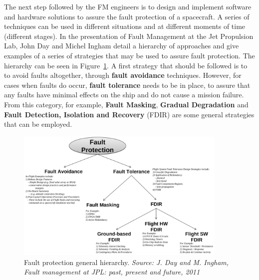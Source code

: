 The next step followed by the FM engineers is to design and implement software
and hardware solutions to assure the fault protection of a spacecraft. A series
of techniques can be used in different situations and at different moments of
time (different stages). In the presentation of Fault Management at the Jet
Propulsion Lab\cite{fm-jpl}, John Day and Michel Ingham detail a hierarchy of
approaches and give examples of a series of strategies that may be used to
assure fault protection. The hierarchy can be seen in
Figure~\ref{fig:fault_protection_hierarchy}. A first strategy that should be
followed is to to avoid faults altogether, through \textbf{fault avoidance}
techniques. However, for cases when faults do occur, \textbf{fault tolerance}
needs to be in place, to assure that any faults have minimal effects on the ship
and do not cause a mission failure. From this category, for example,
\textbf{Fault Masking}, \textbf{Gradual Degradation} and \textbf{Fault
Detection, Isolation and Recovery} (FDIR) are some general strategies that can
be employed.

\begin{figure}[htb]
	\begin{center}
	\includegraphics[width=0.9\textwidth]{img/fault_protection_hierarchy.png}
	\caption{Fault protection general hierarchy. \small{\textit{Source: J.
	Day and M. Ingham, Fault management at JPL: past, present and future, 2011}}}
	\label{fig:fault_protection_hierarchy}
	\end{center}
\end{figure}

